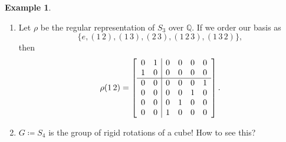 \documentclass[12pt]{article}
\newcommand{\q}{\mathbb{Q}}
\theoremstyle{definition}
\newtheorem{definition}[theorem]{Definition}
\newtheorem{example}{Example}[section]
\begin{document}
\begin{example}
\begin{enumerate}
        For example, if $G\coloneqq S_3$ and $k\coloneqq \q$, then 
        \begin{equation}
            \begin{split}
                (1\,2\,3)\left(5e-4(1\,2)+7(1\,3\,2)\right)&=5(1\,2\,3)(e)5-4(1\,2\,3)(1\,2)+7(1\,2\,3)(1\,3\,2)7\\
                &=5(1\,2\,3\,)-4(1\,3)4+7e\\
                &=\boxed{7e-4(1\,3)+5(1\,2\,3).}
            \end{split}
        \end{equation}
        \begin{definition}
            This is the \textbf{Regular representation} of $G$. It has dimension $n\coloneqq |G|$. We'll see late that this is the Mother of all representations. (Every representation is composed of irreducible blocks, and the regular representation contains a complete set of the available blocks.)
        \end{definition}
        \item Let $\rho$ be the regular representation of $S_3$ over $\q$. If we order our basis as
        \begin{equation}
            \{e,(1\,2),(1\,3),(2\,3),(1\,2\,3),(1\,3\,2)\},
        \end{equation}
        then 
        \begin{equation}
            \rho(1\,2)=
            \left[\begin{array}{c c | c c c c}
                0 & 1 & 0 & 0 & 0 & 0 \\
                1 & 0 & 0 & 0 & 0 & 0 \\
                \hline 
                0 & 0 & 0 & 0 & 0 & 1 \\
                0 & 0 & 0 & 0 & 1 & 0 \\
                0 & 0 & 0 & 1 & 0 & 0 \\
                0 & 0 & 1 & 0 & 0 & 0
            \end{array}
            \right].
        \end{equation}
        \item $G\coloneqq S_4$ is the group of rigid rotations of a cube! How to see this?
        

\end{enumerate}
\end{example}
\end{document}
